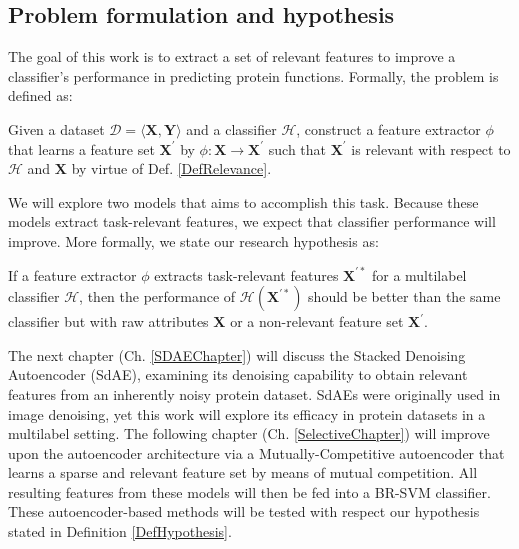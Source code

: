 \subsection{Problem formulation and hypothesis}

\par The goal of this work is to extract a set of relevant features to
improve a classifier's performance in predicting protein functions. Formally,
the problem is defined as:

\begin{definition}
  \label{DefProblem}
  Given a dataset $\mathcal{D}=\langle \mathbf{X}, \mathbf{Y} \rangle$ and a
  classifier $\mathcal{H}$, construct a feature extractor $\phi$ that learns
  a feature set $\mathbf{X}^{\prime}$ by $\phi: \mathbf{X} \rightarrow
  \mathbf{X}^{\prime}$ such that $\mathbf{X}^{\prime}$ is relevant with respect
  to $\mathcal{H}$ and $\mathbf{X}$ by virtue of Def. \ref{DefRelevance}.
\end{definition}

\par\noindent We will explore two models that aims to accomplish this task.
Because these models extract task-relevant features, we expect that
classifier performance will improve. More formally, we state our research
hypothesis as:

\begin{definition}
  \label{DefHypothesis}
  If a feature extractor $\phi$ extracts task-relevant features
  $\mathbf{X}^{\prime\ast}$ for a multilabel classifier $\mathcal{H}$, then
  the performance of $\mathcal{H}(\mathbf{X}^{\prime\ast})$ should be
  better than the same classifier but with raw attributes $\mathbf{X}$
  or a non-relevant feature set $\mathbf{X}^{\prime}$.
\end{definition}


\par The next chapter (Ch. \ref{SDAEChapter}) will discuss the Stacked
Denoising Autoencoder (SdAE), examining its denoising capability to obtain
relevant features from an inherently noisy protein dataset. SdAEs were
originally used in image denoising, yet this work will explore its efficacy
in protein datasets in a multilabel setting. The following chapter (Ch.
\ref{SelectiveChapter}) will improve upon the autoencoder architecture via a
Mutually-Competitive autoencoder that learns a sparse and relevant feature
set by means of mutual competition. All resulting features from these models
will then be fed into a BR-SVM classifier. These autoencoder-based methods
will be tested with respect our hypothesis stated in Definition
\ref{DefHypothesis}.